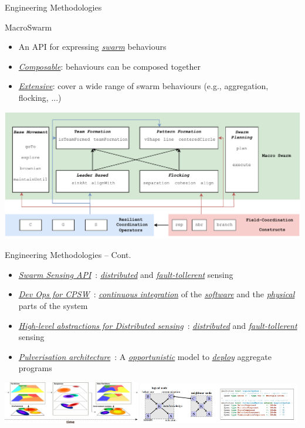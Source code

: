 \documentclass[presentation, 9pt,169]{beamer}\mode<presentation>{\usetheme{AMSBolognaFC}}
\begin{document}
\begin{frame}{Engineering Methodologies}
\begin{exampleblock}{MacroSwarm~\cite{macroswarm}}
  \begin{itemize}
    \item An API for expressing \underline{\emph{swarm}} behaviours
    \item \emph{\underline{Composable}}: behaviours can be composed together
    \item \emph{\underline{Extensive}}: cover a wide range of swarm behaviours (e.g., aggregation, flocking, ...)
  \end{itemize}
\includegraphics[width=\textwidth]{img/architecture-macro.drawio.pdf}
\end{exampleblock}
\end{frame}
\begin{frame}{Engineering Methodologies -- Cont.}
  \begin{itemize}
    \item \emph{\underline{Swarm Sensing API}}~\cite{swarm-clustering}: \emph{\underline{distributed}} and \emph{\underline{fault-tollerent}} sensing
    \item \emph{\underline{Dev Ops for CPSW}}~\cite{casadei2022towards}: \emph{\underline{continuous integration}} of the \emph{\underline{software}} and the \emph{\underline{physical}} parts of the system
    \item \emph{\underline{High-level abstractions for Distributed sensing}}~\cite{aguzzi2022dynamic}: \emph{\underline{distributed}} and \emph{\underline{fault-tollerent}} sensing
    \item \emph{\underline{Pulverisation architecture}}~\cite{aguzzi2021towards}: A \emph{\underline{opportunistic}} model to \emph{\underline{deploy}} aggregate programs
  \end{itemize}
  \vspace{0.5cm}
  \includegraphics[width=0.45\textwidth]{img/action-with-multilayer.pdf}
  \includegraphics[width=0.53\textwidth]{img/screenshot.png}
  
\end{frame}
\end{document}
